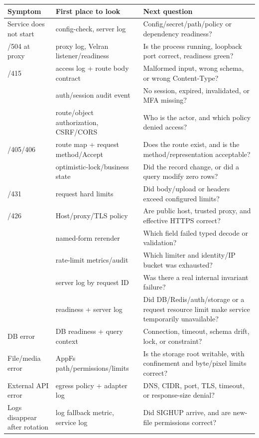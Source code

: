 \begin{longtable}{L{0.23\textwidth}L{0.30\textwidth}L{0.38\textwidth}}
\toprule
Symptom & First place to look & Next question \\
\midrule
\endhead
Service does not start & config-check, server log & Config/secret/path/policy or dependency readiness? \\
/504 at proxy & proxy log, Velran listener/readiness & Is the process running, loopback port correct, readiness green? \\
/415 & access log + route body contract & Malformed input, wrong schema, or wrong Content-Type? \\
 & auth/session audit event & No session, expired, invalidated, or MFA missing? \\
 & route/object authorization, CSRF/CORS & Who is the actor, and which policy denied access? \\
/405/406 & route map + request method/Accept & Does the route exist, and is the method/representation acceptable? \\
 & optimistic-lock/business state & Did the record change, or did a  query modify zero rows? \\
/431 & request hard limits & Did body/upload or headers exceed configured limits? \\
/426 & Host/proxy/TLS policy & Are public host, trusted proxy, and effective HTTPS correct? \\
 & named-form rerender & Which field failed typed decode or validation? \\
 & rate-limit metrics/audit & Which limiter and identity/IP bucket was exhausted? \\
 & server log by request ID & Was there a real internal invariant failure? \\
 & readiness + server log & Did DB/Redis/auth/storage or a request resource limit make service temporarily unavailable? \\
\addlinespace
DB error & DB readiness + query context & Connection, timeout, schema drift, lock, or constraint? \\
\addlinespace
File/media error & AppFs path/permissions/limits & Is the storage root writable, with confinement and byte/pixel limits correct? \\
\addlinespace
External API error & egress policy + adapter log & DNS, CIDR, port, TLS, timeout, or response-size denial? \\
\addlinespace
Logs disappear after rotation & log fallback metric, service log & Did SIGHUP arrive, and are new-file permissions correct? \\
\bottomrule
\end{longtable}

